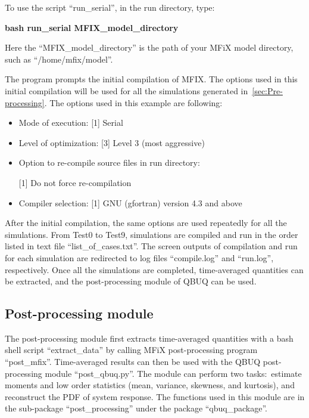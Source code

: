 \documentclass[a4paper,12pt,titlepage]{article}
\newcommand{\MFIX}{MFiX }
\begin{document}
To use the script ``run\_serial'', in the run directory, type:

\textbf{bash run\_serial MFIX\_model\_directory}

Here the ``MFIX\_model\_directory'' is the path of your \MFIX model directory,
such as ``/home/mfix/model''.

The program prompts the initial compilation of MFIX. The options used in this
initial compilation will be used for all the simulations generated
in~\ref{sec:Pre-processing}. The options used in this example are following:

\begin{itemize}
 \item Mode of execution: [1] Serial
 \item Level of optimization: [3] Level 3 (most aggressive)
 \item Option to re-compile source files in run directory: 
 
 [1] Do not force re-compilation
 \item Compiler selection: [1] GNU (gfortran) version 4.3 and above
\end{itemize}

After the initial compilation, the same options are used repeatedly for all the
simulations. From Test0 to Test9, simulations are compiled and run in the order
listed in text file ``list\_of\_cases.txt''. The screen outputs of compilation
and run for each simulation are redirected to log files ``compile.log'' and
``run.log'', respectively. Once all the simulations are completed, time-averaged
quantities can be extracted, and the post-processing module of QBUQ can be used.

\subsection{Post-processing module}
\label{sec:Post-processing}

The post-processing module first extracts time-averaged quantities with a bash
shell script ``extract\_data'' by calling \MFIX post-processing program
``post\_mfix''. Time-averaged results can then be used with the QBUQ
post-\\processing module ``post\_qbuq.py''. The module can perform two tasks:\
estimate moments and low order statistics (mean, variance, skewness, and
kurtosis), and reconstruct the PDF of system response. The functions used in
this module are in the sub-package ``post\_processing'' under the package
``qbuq\_package''.
\end{document}
